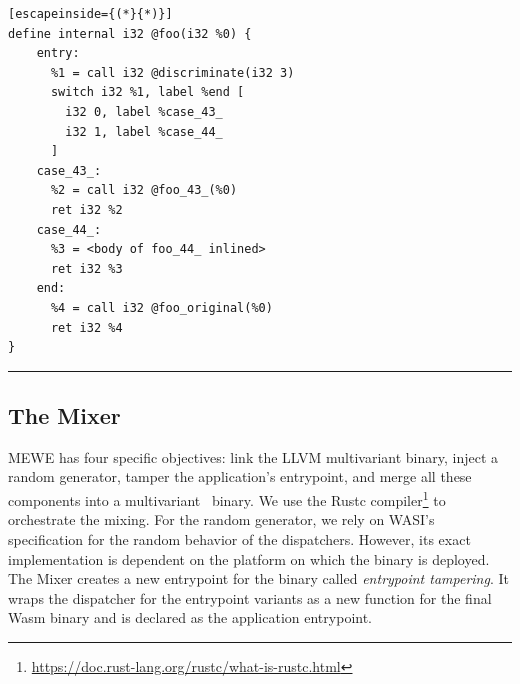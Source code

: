 \lstset{
    language=llvm,
    basicstyle=\footnotesize\ttfamily,
    columns=fullflexible,
    breaklines=true,
    numbers=none,
    stepnumber=1,
    float
}

\begin{code}
\scriptsize
\noindent\begin{minipage}[b]{\linewidth}
    \begin{minipage}[t]{1\linewidth}
        \begin{lstlisting}[escapeinside={(*}{*)}]
define internal i32 @foo(i32 %0) {
    entry:
      %1 = call i32 @discriminate(i32 3)
      switch i32 %1, label %end [
        i32 0, label %case_43_
        i32 1, label %case_44_
      ]
    case_43_:                 
      %2 = call i32 @foo_43_(%0)
      ret i32 %2
    case_44_:                
      %3 = <body of foo_44_ inlined>
      ret i32 %3
    end:                                             
      %4 = call i32 @foo_original(%0)
      ret i32 %4
}
        \end{lstlisting}
    \end{minipage}%
    
    \noindent\rule{\linewidth}{0.4pt}
    \label{listing:multivariant_template}
\end{minipage}
\end{code}

\subsection{The Mixer}

MEWE has four specific objectives: link the LLVM multivariant binary, inject a random generator, tamper the application's entrypoint, and merge all these components into a multivariant \wasm\ binary.
We use the Rustc compiler\footnote{\url{https://doc.rust-lang.org/rustc/what-is-rustc.html}} to orchestrate the mixing.
For the random generator, we rely on WASI's specification \cite{WASI} for the random behavior of the dispatchers. However, its exact implementation is dependent on the platform on which the binary is deployed.
The Mixer creates a new entrypoint for the binary called \emph{entrypoint tampering}.
It wraps the dispatcher for the entrypoint variants as a new function for the final Wasm binary and is declared as the application entrypoint. 
